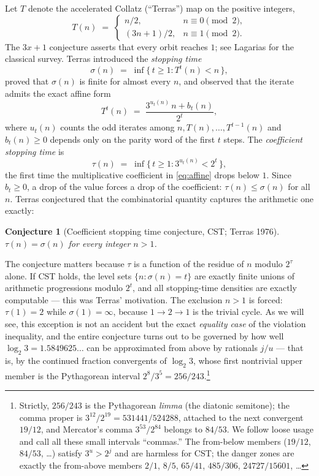 \documentclass[10pt]{article}
\newtheorem{conjecture}[theorem]{Conjecture}
\theoremstyle{definition}
\theoremstyle{remark}
\newcommand{\lb}{\log_2 3}
\begin{document}
Let $T$ denote the accelerated Collatz (``Terras'') map on the positive
integers,
\[
T(n) \;=\;
\begin{cases}
 n/2, & n \equiv 0 \pmod 2,\\[2pt]
 (3n+1)/2, & n \equiv 1 \pmod 2.
\end{cases}
\]
The $3x+1$ conjecture asserts that every orbit reaches $1$; see Lagarias
\cite{Lagarias1985} for the classical survey. Terras \cite{Terras1976}
introduced the \emph{stopping time}
\[
\sigma(n) \;=\; \inf\{\, t \ge 1 : T^{t}(n) < n \,\},
\]
proved that $\sigma(n)$ is finite for almost every $n$, and observed that the
iterate admits the exact affine form
\begin{equation}\label{eq:affine}
T^{t}(n) \;=\; \frac{3^{u_t(n)}\, n + b_t(n)}{2^{t}},
\end{equation}
where $u_t(n)$ counts the odd iterates among $n, T(n), \dots, T^{t-1}(n)$ and
$b_t(n) \ge 0$ depends only on the parity word of the first $t$ steps. The
\emph{coefficient stopping time} is
\[
\tau(n) \;=\; \inf\{\, t \ge 1 : 3^{u_t(n)} < 2^{t} \,\},
\]
the first time the multiplicative coefficient in \eqref{eq:affine} drops below
$1$. Since $b_t \ge 0$, a drop of the value forces a drop of the coefficient:
$\tau(n) \le \sigma(n)$ for all $n$. Terras conjectured that the combinatorial
quantity captures the arithmetic one exactly:

\begin{conjecture}[Coefficient stopping time conjecture, CST; Terras 1976]
\label{conj:cst}
$\tau(n) = \sigma(n)$ for every integer $n > 1$.
\end{conjecture}

The conjecture matters because $\tau$ is a function of the residue of $n$
modulo $2^{\tau}$ alone. If CST holds, the level sets
$\{n : \sigma(n) = t\}$ are exactly finite unions of arithmetic progressions
modulo $2^{t}$, and all stopping-time densities are exactly computable ---
this was Terras' motivation. The exclusion $n>1$ is forced: $\tau(1)=2$ while
$\sigma(1)=\infty$, because $1 \to 2 \to 1$ is the trivial cycle. As we will
see, this exception is not an accident but the exact \emph{equality case} of
the violation inequality, and the entire conjecture turns out to be governed
by how well $\lb = 1.5849625\ldots$ can be approximated from above by
rationals $j/u$ --- that is, by the continued fraction convergents of $\lb$,
whose first nontrivial upper member is the Pythagorean interval
$2^{8}/3^{5} = 256/243$.\footnote{Strictly, $256/243$ is the Pythagorean
\emph{limma} (the diatonic semitone); the comma proper is
$3^{12}/2^{19} = 531441/524288$, attached to the next convergent $19/12$, and
Mercator's comma $3^{53}/2^{84}$ belongs to $84/53$. We follow loose usage and
call all these small intervals ``commas.'' The from-below members ($19/12$,
$84/53$, \dots) satisfy $3^{u} > 2^{j}$ and are harmless for CST; the danger
zones are exactly the from-above members $2/1$, $8/5$, $65/41$, $485/306$,
$24727/15601$, \dots}
\end{document}
